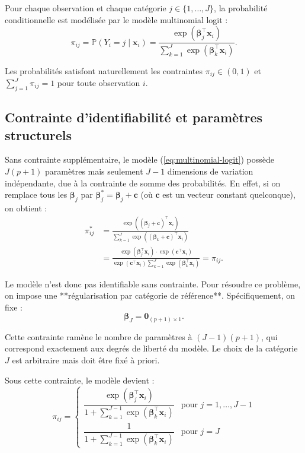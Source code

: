 \documentclass[12pt,a4paper]{article}
\begin{document}
Pour chaque observation et chaque catégorie $j \in \{1,\dots,J\}$, la probabilité conditionnelle est modélisée par le modèle multinomial logit :
\begin{equation}\label{eq:multinomial-logit}
\pi_{ij}=\mathbb{P}(Y_i=j\mid \mathbf{x}_i)=\frac{\exp(\boldsymbol{\beta}_j^\top\mathbf{x}_i)}{\sum_{k=1}^{J}\exp(\boldsymbol{\beta}_k^\top\mathbf{x}_i)}.
\end{equation}

Les probabilités satisfont naturellement les contraintes $\pi_{ij} \in (0,1)$ et $\sum_{j=1}^J \pi_{ij}=1$ pour toute observation $i$.

\subsection{Contrainte d'identifiabilité et paramètres structurels}

Sans contrainte supplémentaire, le modèle (\ref{eq:multinomial-logit}) possède $J(p+1)$ paramètres mais seulement $J-1$ dimensions de variation indépendante, due à la contrainte de somme des probabilités. En effet, si on remplace tous les $\boldsymbol{\beta}_j$ par $\boldsymbol{\beta}_j^* = \boldsymbol{\beta}_j + \mathbf{c}$ (où $\mathbf{c}$ est un vecteur constant quelconque), on obtient :
\begin{align}
\pi_{ij}^* &= \frac{\exp((\boldsymbol{\beta}_j + \mathbf{c})^\top \mathbf{x}_i)}{\sum_{k=1}^J \exp((\boldsymbol{\beta}_k + \mathbf{c})^\top \mathbf{x}_i)} \\
&= \frac{\exp(\boldsymbol{\beta}_j^\top \mathbf{x}_i) \cdot \exp(\mathbf{c}^\top \mathbf{x}_i)}{\exp(\mathbf{c}^\top \mathbf{x}_i) \sum_{k=1}^J \exp(\boldsymbol{\beta}_k^\top \mathbf{x}_i)} = \pi_{ij}.
\end{align}

Le modèle n'est donc pas identifiable sans contrainte. Pour résoudre ce problème, on impose une **régularisation par catégorie de référence**. Spécifiquement, on fixe :
\begin{equation}\label{eq:constraint}
\boldsymbol{\beta}_J=\mathbf{0}_{(p+1) \times 1}.
\end{equation}

Cette contrainte ramène le nombre de paramètres à $(J-1)(p+1)$, qui correspond exactement aux degrés de liberté du modèle. Le choix de la catégorie $J$ est arbitraire mais doit être fixé à priori.

Sous cette contrainte, le modèle devient :
\begin{equation}\label{eq:reference-coded}
\pi_{ij} = \begin{cases}
\dfrac{\exp(\boldsymbol{\beta}_j^\top \mathbf{x}_i)}{1 + \sum_{k=1}^{J-1}\exp(\boldsymbol{\beta}_k^\top \mathbf{x}_i)} & \text{pour } j=1,\dots,J-1 \\
\dfrac{1}{1 + \sum_{k=1}^{J-1}\exp(\boldsymbol{\beta}_k^\top \mathbf{x}_i)} & \text{pour } j=J
\end{cases}
\end{equation}
\end{document}
